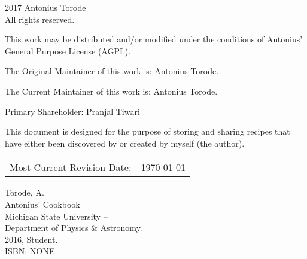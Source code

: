 \pagestyle{empty}

\begingroup
\footnotesize
\parindent 0pt
\parskip \baselineskip
\textcopyright{} 2017 Antonius Torode \\
All rights reserved.

This work may be distributed and/or modified under the conditions of Antonius’ General Purpose License (AGPL).

The Original Maintainer of this work is: Antonius Torode.

The Current Maintainer of this work is: Antonius Torode.

Primary Shareholder: Pranjal Tiwari

This document is designed for the purpose of storing and sharing recipes that have either been discovered by or created by myself (the author).

\begin{center}
\begin{tabular}{ll}
Most Current Revision Date: &  \today 
\end{tabular}
\end{center}

\vfill


Torode, A.\\
\hspace*{2em} Antonius' Cookbook \\
\hspace*{2em} Michigan State University -- \\
\hspace*{2em} Department of Physics \& Astronomy. \\
\hspace*{2em} 2016, Student. \\
\hspace*{2em} ISBN: NONE \\



\endgroup
\clearpage